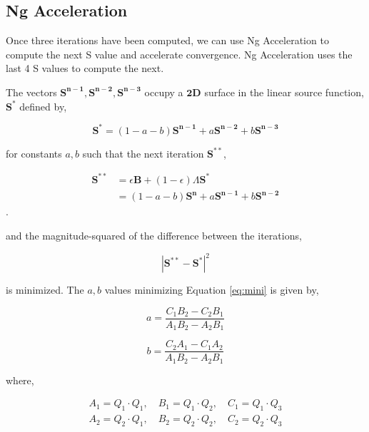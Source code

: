 \documentclass[12pt]{article}
\begin{document}
\subsection{Ng Acceleration}
Once three iterations have been computed, we can use Ng Acceleration \citep{ng_1974} to compute the next S value and accelerate convergence. Ng Acceleration uses the last 4 S values to compute the next. 

The vectors $\mathbf{S^{n-1}},  \mathbf{S^{n-2}}, \mathbf{S^{n-3}}$ occupy a $\mathbf{2D}$ surface in the linear source function, $\mathbf{S}^{*}$ defined by,

\begin{equation}
    \mathbf{S^{*}} = (1-a-b)\mathbf{S^{n-1}} + a\mathbf{S^{n-2}} + b\mathbf{S^{n-3}}
\end{equation}

for constants $a,b$ such that the next iteration $\mathbf{S^{**}}$,

\begin{equation}
\begin{split}
    \mathbf{S^{**}} &= \epsilon \mathbf{B} +(1-\epsilon)\Lambda \mathbf{S^{*}}\\
    & = (1-a-b)\mathbf{S^{n}} + a\mathbf{S^{n-1}} + b\mathbf{S^{n-2}}
\end{split}
\end{equation}. 

and the magnitude-squared of the difference between the iterations,

\begin{equation}\label{eq:mini}
    | \mathbf{S^{**}} - \mathbf{S^{*}}|^{2} 
\end{equation}

is minimized. The $a,b$ values minimizing Equation \ref{eq:mini} is given by,

\begin{equation}
    a = \frac{C_{1}B_{2}-C_{2}B_{1}}{A_{1}B_{2}-A_{2}B_{1}}
\end{equation}

\begin{equation}
    b = \frac{C_{2}A_{1} - C_{1}A_{2}}{A_{1}B_{2}-A_{2}B_{1}}
\end{equation}

where,

\begin{equation}
\begin{split}
    A_{1} = Q_{1}\cdot Q_{1},\quad B_{1}=Q_{1}\cdot Q_{2},\quad C_{1}=Q_{1}\cdot Q_{3}\\
    A_{2} = Q_{2}\cdot Q_{1},\quad B_{2}=Q_{2}\cdot Q_{2},\quad C_{2}=Q_{2}\cdot Q_{3}
\end{split}
\end{equation}
\end{document}
